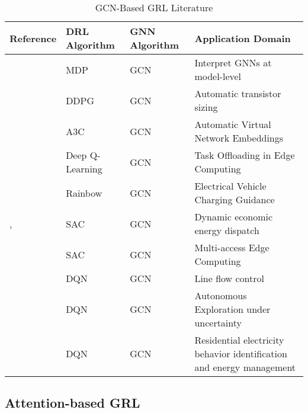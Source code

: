 \begin{table}[H] 
	\centering
	\caption{\acs{GCN}-Based \acs{GRL} Literature}
	\begin{tabular}{|P{2cm}|P{2cm}|P{2cm}|p{5cm}|  }
		\hline
		\textbf{Reference} & \textbf{DRL Algorithm} & \textbf{GNN Algorithm}& \textbf{Application Domain} \\
		\hline
		\cite{yuanXGNNModelLevelExplanations2020} & MDP & GCN & Interpret GNNs at model-level \\ \hline
		\cite{wangGCNRLCircuitDesigner2020} & DDPG & GCN & Automatic transistor sizing \\ \hline
		\cite{yanAutomaticVirtualNetwork2020} & A3C & GCN & Automatic Virtual Network Embeddings \\ \hline
		\cite{tangDependentTaskOffloading2020} & Deep Q-Learning & GCN & Task Offloading in Edge Computing \\ \hline
		\cite{xingGraphReinforcementLearningBased2023} & Rainbow  &  GCN & Electrical Vehicle Charging Guidance \\ \hline
		\cite{liNovelGraphReinforcement2022}, \cite{chenScalableGraphReinforcement2023} & SAC & GCN & Dynamic economic energy dispatch \\ \hline
		\cite{lengGraphConvolutionalNetworkbased2021} & SAC & GCN & Multi-access Edge Computing \\ \hline
		\cite{xuSimulationConstraintGraphReinforcement2020} & DQN & GCN & Line flow control \\ \hline
		\cite{chenAutonomousExplorationUncertainty2020} & DQN & GCN  & Autonomous Exploration under uncertainty \\  \hline
		\cite{chenGraphRepresentationLearningbased2023} & DQN & GCN & Residential electricity behavior identification and energy management \\ \hline
	\end{tabular}
	\label{tab:gcn-lit}
\end{table}




\subsection{Attention-based GRL} \label{sec:review-gat}

